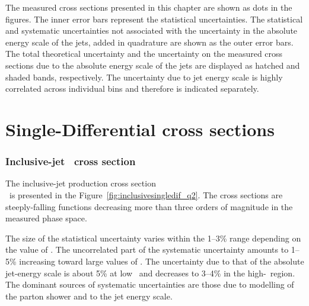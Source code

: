 The measured cross sections presented in this chapter are shown as dots in the figures. The inner error bars represent the statistical uncertainties. The statistical and systematic uncertainties not associated with the uncertainty in the absolute energy scale of the jets, added in quadrature are shown as the outer error bars. The total theoretical uncertainty and the uncertainty on the measured cross sections due to the absolute energy scale of the jets are displayed as hatched and shaded bands, respectively. The uncertainty due to jet energy scale is highly correlated across individual bins and therefore is indicated separately.

\section{Single-Differential cross sections}
\subsubsection*{Inclusive-jet \dsdqsq~cross section}
The inclusive-jet production cross section\\ \dsdetjetb~is presented in the Figure~\ref{fig:inclusivesingledif_q2}. The cross sections are steeply-falling functions decreasing more than three orders of magnitude in the measured phase space.

The size of the statistical uncertainty varies within the 1--3\% range depending on the value of \qsq. The uncorrelated part of the systematic uncertainty amounts to 1--5\% increasing toward large values of \qsq. The uncertainty due to that of the absolute jet-energy scale is about 5\% at low \qsq~and decreases to 3--4\% in the high-\qsq~region. The dominant sources of systematic uncertainties are those due to modelling of the parton shower and to the jet energy scale.

